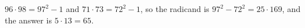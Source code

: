 $96\cdot98=97^2-1$ and $71\cdot73=72^2-1$, so the radicand is $97^2-72^2=25\cdot169$, and the answer is $5\cdot13=\boxed{65}$.
